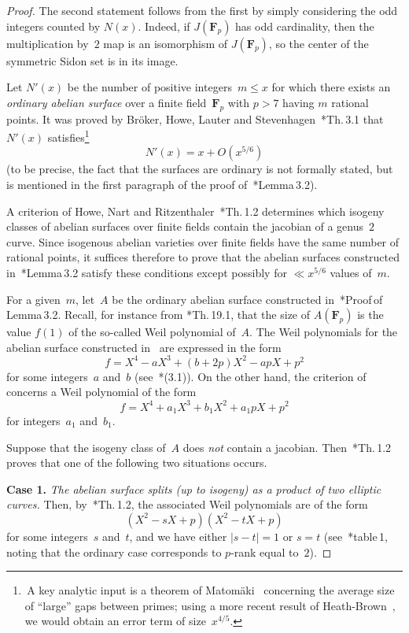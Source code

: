 \documentclass[12pt]{amsart}
\renewcommand{\leq}{\leqslant}
\numberwithin{equation}{section}
\newcommand{\Ff}{\mathbf{F}}
\theoremstyle{plain}
\theoremstyle{remark}
\theoremstyle{definition}
\renewcommand{\leq}{\leqslant}
\begin{document}
\begin{proof}
  The second statement follows from the first by simply
  considering the odd integers counted by $N(x)$. Indeed, if $J(\Ff_p)$ has odd cardinality, then the multiplication
  by~$2$ map is an isomorphism of $J(\Ff_p)$, so the center of the
  symmetric Sidon set is in its image.
  
  Let $N'(x)$ be the number  of positive integers~$m\leq x$ for which there exists an \emph{ordinary abelian surface} over a finite field~$\Ff_p$ with $p>7$ having $m$ rational points. It was proved by Bröker, Howe, Lauter and
  Stevenhagen~\cite{bhls}*{Th.\,3.1} that $N'(x)$ satisfies\footnote{\,A key analytic input is a theorem of
    Matom\"aki~\cite{mato} concerning the average size of ``large'' gaps
    between primes; using a more recent result of
    Heath-Brown~\cite{hb}, we would obtain an error term of
    size~$x^{4/5}$.}
  \[
    N'(x)=x+O(x^{5/6})
  \]
  (to be precise, the fact that the surfaces are ordinary is not
  formally stated, but is mentioned in the first paragraph of the
  proof of~\cite{bhls}*{Lemma\,3.2}).

  A criterion of Howe, Nart and Ritzenthaler~\cite{hnr}*{Th.\,1.2}
  determines which isogeny classes of abelian surfaces over finite
  fields contain the jacobian of a genus~$2$ curve. Since isogenous
  abelian varieties over finite fields have the same number of
  rational points, it suffices therefore to prove that the abelian
  surfaces constructed in~\cite{bhls}*{Lemma\,3.2} satisfy these
  conditions except possibly for $\ll x^{5/6}$ values of~$m$.

  For a given~$m$, let~$A$ be the ordinary abelian surface constructed
  in~\cite{bhls}*{Proof\,of\,Lemma\,3.2}.  Recall, for instance from \cite{milne1}*{Th.\,19.1}, that the size of
  $A(\Ff_p)$ is the value $f(1)$ of the so-called Weil polynomial
  of~$A$. The Weil polynomials
  for the abelian surface constructed in~\cite{bhls} are expressed in
  the form
  \[
    f = X^4 -aX^3+ (b + 2p)X^2 - apX + p^2
  \]
  for some integers~$a$ and~$b$ (see~\cite{bhls}*{(3.1)}).  On the other
  hand, the criterion of~\cite{hnr} concerns a Weil polynomial of the
  form
  \[
    f=X^4+a_1X^3+b_1X^2+a_1pX+p^2
  \]
  for integers~$a_1$ and~$b_1$.

  Suppose that the isogeny class of~$A$ does \emph{not} contain a
  jacobian.  Then~\cite{hnr}*{Th.\,1.2} proves that one of the
  following two situations occurs.
  
  \textbf{Case 1.} \emph{The abelian surface splits (up to isogeny) as a
    product of two elliptic curves.} Then, by~\cite{hnr}*{Th.\,1.2}, the
  associated Weil polynomials are of the form
  \[
    (X^2-sX+p)(X^2-tX+p)
  \]
  for some integers~$s$ and~$t$, and we have either $|s-t|=1$ or $s=t$
  (see~\cite{hnr}*{table\,1}, noting that the ordinary case corresponds
  to $p$-rank equal to~$2$).


\end{proof}
\end{document}
